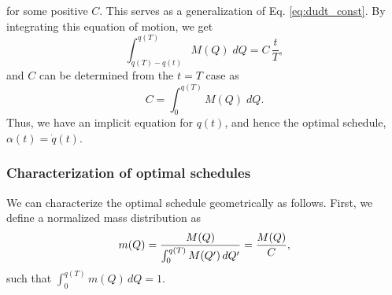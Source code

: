 \documentclass[reprint, superscriptaddress, floatfix]{revtex4-1}
\begin{document}
%
for some positive $C$.
%
This serves
as a generalization of Eq. \eqref{eq:dudt_const}.
%
By integrating this equation of motion, we get
%
\begin{equation}
  \int_{ q(T) - q(t) }^{ q(T) }
    M(Q)
    \;
    d Q
  =
  C \, \frac t T
  ,
  \label{eq:q_opt}
\end{equation}
%
and $C$ can be determined from
the $t = T$ case as
%
\begin{equation}
  C =
  \int_{ 0 }^{ q(T) }
    M( Q )
    \;
    d Q
  .
  \label{eq:mint}
\end{equation}
%
Thus, we have an implicit equation for $q(t)$,
and hence the optimal schedule,
$\alpha(t) = \dot q(t)$.




\subsubsection{\label{sec:mass_distr}
Characterization of optimal schedules}



We can characterize the optimal schedule
geometrically as follows.
%
First, we define
a normalized mass distribution as
%
\begin{equation}
  m(Q)
  =
  \frac{
    M(Q)
  }
  {
    \int_0^{ q(T) } M(Q') \, d Q'
  }
  =
  \frac{
    M(Q)
  }
  {
    C
  }
  ,
\notag
\end{equation}
%
such that
$\int_0^{q(T)} m(Q) \, dQ = 1$.
%
\end{document}
